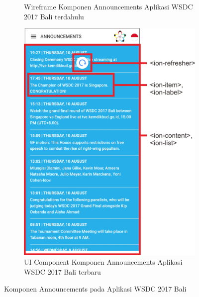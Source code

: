 \begin{enumerate}
\begin{figure}[H]
\begin{subfigure}[b]{0.43\textwidth}
         	\caption{Wireframe Komponen Announcements Aplikasi WSDC 2017 Bali terdahulu}
         	\label{fig:announcementsPageWireframe}
     	\end{subfigure}
     	\hspace*{0.5in}
     	\begin{subfigure}[b]{0.43\textwidth}
         	\centering
         	\includegraphics[scale=0.4]{Gambar/AnnouncementsPageKini.png}
         	\caption{UI Component Komponen Announcements Aplikasi WSDC 2017 Bali terbaru}
         	\label{fig:AnnouncementsPageKini}
     	\end{subfigure}
        \caption{Komponen Announcements pada Aplikasi WSDC 2017 Bali}
        \label{fig:UIComponent1}
	\end{figure}
	

\end{enumerate}
